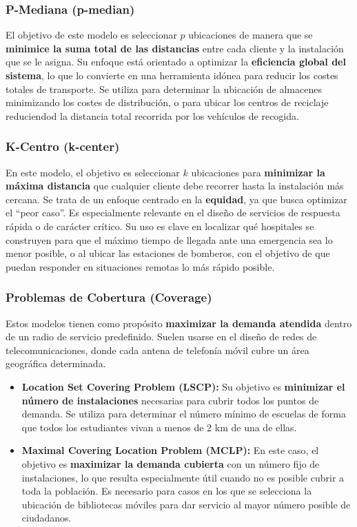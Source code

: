 \documentclass[12pt,a4paper]{book}
\begin{document}
\subsubsection{P-Mediana (p-median)}
El objetivo de este modelo es seleccionar $p$ ubicaciones de manera que se \textbf{minimice la suma total de las distancias} entre cada cliente y la instalación que se le asigna. Su enfoque está orientado a optimizar la \textbf{eficiencia global del sistema}, lo que lo convierte en una herramienta idónea para reducir los costes totales de transporte.
Se utiliza para determinar la ubicación de almacenes minimizando los costes de distribución, o para ubicar los centros de reciclaje reduciendod la distancia total recorrida por los vehículos de recogida.

\subsubsection{K-Centro (k-center)}
En este modelo, el objetivo es seleccionar $k$ ubicaciones para \textbf{minimizar la máxima distancia} que cualquier cliente debe recorrer hasta la instalación más cercana. Se trata de un enfoque centrado en la \textbf{equidad}, ya que busca optimizar el ``peor caso''. Es especialmente relevante en el diseño de servicios de respuesta rápida o de carácter crítico.
Su uso es clave en localizar qué hospitales se construyen para que el máximo tiempo de llegada ante una emergencia sea lo menor posible, o al ubicar las estaciones de bomberos, con el objetivo de que puedan responder
en situaciones remotas lo más rápido posible.

\subsubsection{Problemas de Cobertura (Coverage)} 
Estos modelos tienen como propósito \textbf{maximizar la demanda atendida} dentro de un radio de servicio predefinido. 
Suelen usarse en el diseño de redes de telecomunicaciones, donde cada antena de telefonía móvil cubre un área geográfica determinada.

\begin{itemize}
    \item \textbf{Location Set Covering Problem (LSCP):}
    Su objetivo es \textbf{minimizar el número de instalaciones} necesarias para cubrir todos los puntos de demanda.
Se utiliza para determinar el número mínimo de escuelas de forma que todos los estudiantes vivan a menos de 2 km de una de ellas.

    \item \textbf{Maximal Covering Location Problem (MCLP):}
En este caso, el objetivo es \textbf{maximizar la demanda cubierta} con un número fijo de instalaciones, lo que resulta especialmente útil cuando no es posible cubrir a toda la población.
Es necesario para casos en los que se selecciona la ubicación de bibliotecas móviles para dar servicio al mayor número posible de ciudadanos.

\end{itemize}
\end{document}
